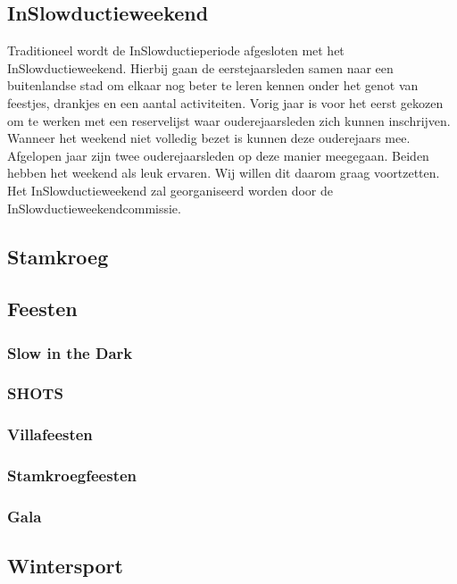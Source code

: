 \documentclass[]{article}
\begin{document}
\subsection{InSlowductieweekend}
Traditioneel wordt de InSlowductieperiode afgesloten met het InSlowductieweekend. Hierbij gaan de eerstejaarsleden samen naar een buitenlandse stad om elkaar nog beter te leren kennen onder het genot van feestjes, drankjes en een aantal activiteiten. Vorig jaar is voor het eerst gekozen om te werken met een reservelijst waar ouderejaarsleden zich kunnen inschrijven. Wanneer het weekend niet volledig bezet is kunnen deze ouderejaars mee. Afgelopen jaar zijn twee ouderejaarsleden op deze manier meegegaan. Beiden hebben het weekend als leuk ervaren. Wij willen dit daarom graag voortzetten. Het InSlowductieweekend zal georganiseerd worden door de InSlowductieweekendcommissie.

\subsection{Stamkroeg}

\subsection{Feesten}
\subsubsection{Slow in the Dark}

\subsubsection{SHOTS}

\subsubsection{Villafeesten}

\subsubsection{Stamkroegfeesten}

\subsubsection{Gala}

\subsection{Wintersport}
\end{document}
